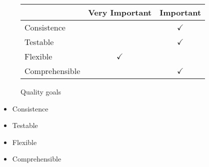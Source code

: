 \begin{frame}
\tiny
\begin{figure}[]
		\begin{tabular}{| l | m{} | m{}|} \hline
 & Very Important&Important \\ \hline
Consistence  				&& \multicolumn{1}{c|}{$\checkmark$} 		\\ \hline
Testable  					&& \multicolumn{1}{c|}{$\checkmark$} 		\\ \hline
Flexible  					& \multicolumn{1}{c|}{$\checkmark$}& 		\\ \hline
Comprehensible  		&& \multicolumn{1}{c|}{$\checkmark$} 		\\ \hline
		\end{tabular}
	\label{fig:prioritizedCrit}
	\caption{Quality goals}
\end{figure}

\normalsize
\begin{itemize}
	\item Consistence
	\item Testable
	\item Flexible
	\item Comprehensible
\end{itemize}

\end{frame}